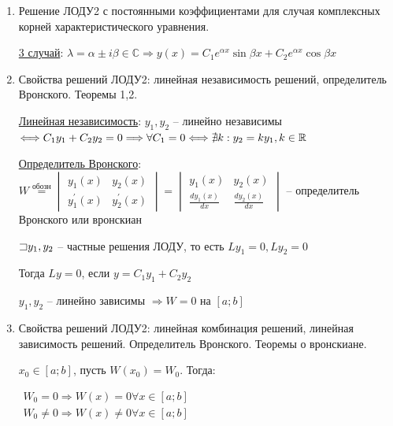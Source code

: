 \documentclass[12pt]{article}
\begin{document}
\begin{enumerate}
        \item Решение ЛОДУ2 с постоянными коэффициентами для случая комплексных корней характеристического уравнения.

        \hyperlink{ldesgcomplexsolutions}{3 случай}: $\lambda = \alpha \pm i \beta \in \mathbb{C} \Longrightarrow y(x) = C_1 e^{\alpha x} \sin \beta x + C_2 e^{\alpha x} \cos \beta x$


        \item Свойства решений ЛОДУ2: линейная независимость решений, определитель Вронского. Теоремы 1,2.

        \hyperlink{linearindependance}{Линейная независимость}: \Defs $y_1, y_2$ -- линейно независимы $\Longleftrightarrow C_1 y_1 + C_2 y_2 = 0 \Longrightarrow \forall C_1 = 0 \Longleftrightarrow \nexists k : y_2 = k y_1, k \in \mathbb{R}$
        
        \hyperlink{determinantWronski}{Определитель Вронского}: \Defs $W \stackrel{\text{обозн}}{=} \begin{vmatrix}y_1(x) & y_2(x) \\ y_1^\prime(x) & y_2^\prime(x)\end{vmatrix} = \begin{vmatrix}y_1(x) & y_2(x) \\ \frac{d y_1(x)}{dx} & \frac{d y_2(x)}{dx}\end{vmatrix}$ -- определитель Вронского или вронскиан

        \begin{MyTheorem}
             $\mathord{\sqsupset} y_1, y_2$ -- частные решения ЛОДУ, то есть $Ly_1 = 0, Ly_2 = 0$

            Тогда $Ly = 0$, если $y = C_1 y_1 + C_2 y_2$
        \end{MyTheorem}

        \begin{MyTheorem}
             $y_1, y_2$ -- линейно зависимы $\Longrightarrow W = 0$ на $[a;b]$
        \end{MyTheorem}    

        \item Свойства решений ЛОДУ2: линейная комбинация решений, линейная зависимость решений. Определитель Вронского. Теоремы о вронскиане.

        \begin{MyTheorem}
             $x_0 \in [a;b]$, пусть $W(x_0) = W_0$. Тогда: 
            
            $\begin{matrix}W_0 = 0 \Longrightarrow W(x) = 0 \forall x \in [a;b] \\
            W_0 \neq 0 \Longrightarrow W(x) \neq 0 \forall x \in [a;b]\end{matrix}$
        \end{MyTheorem}


\end{enumerate}
\end{document}
